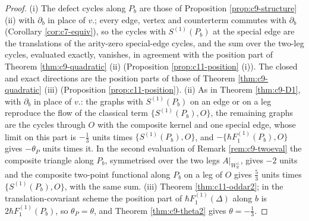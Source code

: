 \begin{proof}
(i) The defect cycles along $P_b$ are those of Proposition \ref{prop:c9-structure} (ii) with $\partial_b$ in place of $v.$; every edge, vertex and counterterm commutes with $\partial_b$ (Corollary \ref{cor:c7-equiv}), so the cycles with $S^{(1)}(P_b)$ at the special edge are the translations of the arity-zero special-edge cycles, and the sum over the two-leg cycles, evaluated exactly, vanishes, in agreement with the position part of Theorem \ref{thm:c9-quadratic} (ii) (Proposition \ref{prop:c11-position} (i)). The closed and exact directions are the position parts of those of Theorem \ref{thm:c9-quadratic} (iii) (Proposition \ref{prop:c11-position}). (ii) As in Theorem \ref{thm:c9-D1}, with $\partial_b$ in place of $v.$: the graphs with $S^{(1)}(P_b)$ on an edge or on a leg reproduce the flow of the classical term $\{S^{(1)}(P_b),O\}$, the remaining graphs are the cycles through $O$ with the composite kernel and one special edge, whose limit on this part is $-\tfrac13$ units times $\{S^{(1)}(P_b),O\}$, and $-\{\hbar F_1^{(1)}(P_b),O\}$ gives $-\theta_P$ units times it. In the second evaluation of Remark \ref{rem:c9-twoeval} the composite triangle along $P_b$, symmetrised over the two legs $A|_{W_{\mathbb R}^\perp}$, gives $-2$ units and the composite two-point functional along $P_b$ on a leg of $O$ gives $\tfrac53$ units times $\{S^{(1)}(P_b),O\}$, with the same sum. (iii) Theorem \ref{thm:c11-oddar2}; in the translation-covariant scheme the position part of $\hbar F_1^{(1)}(\Delta)$ along $b$ is $2\hbar F_1^{(1)}(P_b)$, so $\theta_P=\theta$, and Theorem \ref{thm:c9-theta2} gives $\theta=-\tfrac13$.
\end{proof}
